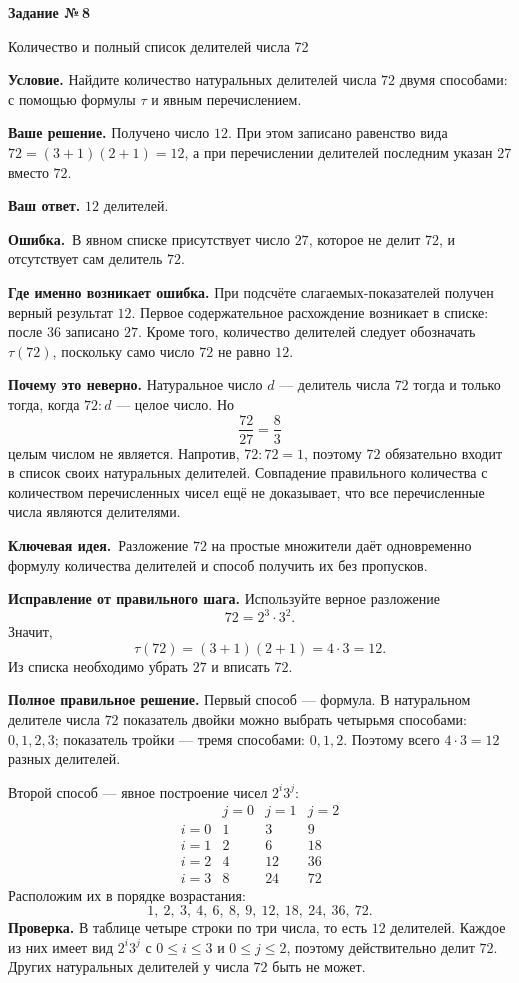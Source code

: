 \documentclass[a4paper,12pt]{article}
\newcommand{\keyidea}{\textcolor{accent}{\textbf{Ключевая идея.}}\ }
\newcommand{\errorhead}{\textcolor{red!65!black}{\textbf{Ошибка.}}\ }
\newcommand{\tasktitle}[2]{%
  \clearpage\phantomsection\label{task:#1}%
  {\Large\bfseries\color{deep}Задание №\,#1}\par\vspace{2mm}
  {\color{muted}\large #2}\par\vspace{5mm}
}
\begin{document}
\tasktitle{8}{Количество и полный список делителей числа 72}
\textbf{Условие.} Найдите количество натуральных делителей числа $72$ двумя способами: с помощью формулы $\tau$ и явным перечислением.

\textbf{Ваше решение.} Получено число $12$. При этом записано равенство вида $72=(3+1)(2+1)=12$, а при перечислении делителей последним указан $27$ вместо $72$.

\textbf{Ваш ответ.} $12$ делителей.

\errorhead В явном списке присутствует число $27$, которое не делит $72$, и отсутствует сам делитель $72$.

\textbf{Где именно возникает ошибка.} При подсчёте слагаемых-показателей получен верный результат $12$. Первое содержательное расхождение возникает в списке: после $36$ записано $27$. Кроме того, количество делителей следует обозначать $\tau(72)$, поскольку само число $72$ не равно $12$.

\textbf{Почему это неверно.} Натуральное число $d$ --- делитель числа $72$ тогда и только тогда, когда $72:d$ --- целое число. Но
\[
 \frac{72}{27}=\frac83
\]
целым числом не является. Напротив, $72:72=1$, поэтому $72$ обязательно входит в список своих натуральных делителей. Совпадение правильного количества с количеством перечисленных чисел ещё не доказывает, что все перечисленные числа являются делителями.

\keyidea Разложение $72$ на простые множители даёт одновременно формулу количества делителей и способ получить их без пропусков.

\textbf{Исправление от правильного шага.} Используйте верное разложение
\[
72=2^3\cdot3^2.
\]
Значит,
\[
\tau(72)=(3+1)(2+1)=4\cdot3=12.
\]
Из списка необходимо убрать $27$ и вписать $72$.

\newpage\textbf{Полное правильное решение.} Первый способ --- формула. В натуральном делителе числа $72$ показатель двойки можно выбрать четырьмя способами: $0,1,2,3$; показатель тройки --- тремя способами: $0,1,2$. Поэтому всего $4\cdot3=12$ разных делителей.

Второй способ --- явное построение чисел $2^i3^j$:
\[
\begin{array}{c|ccc}
 &j=0&j=1&j=2\\\hline
 i=0&1&3&9\\
 i=1&2&6&18\\
 i=2&4&12&36\\
 i=3&8&24&72
\end{array}
\]
Расположим их в порядке возрастания:
\[
\boxed{1,\ 2,\ 3,\ 4,\ 6,\ 8,\ 9,\ 12,\ 18,\ 24,\ 36,\ 72.}
\]
\textbf{Проверка.} В таблице четыре строки по три числа, то есть $12$ делителей. Каждое из них имеет вид $2^i3^j$ с $0\le i\le3$ и $0\le j\le2$, поэтому действительно делит $72$. Других натуральных делителей у числа $72$ быть не может.
\end{document}
